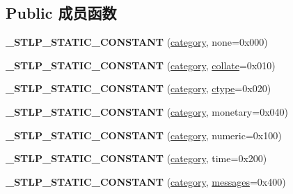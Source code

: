 \subsection*{Public 成员函数}
\begin{DoxyCompactItemize}
\item 
\mbox{\label{classlocale_a877d7476d068fb569aa14200c6323edd}} 
{\bfseries \+\_\+\+S\+T\+L\+P\+\_\+\+S\+T\+A\+T\+I\+C\+\_\+\+C\+O\+N\+S\+T\+A\+NT} (\hyperlink{structcategory}{category}, none=0x000)
\item 
\mbox{\label{classlocale_ab01bb09e7d17151e6d91c473d5b57ec4}} 
{\bfseries \+\_\+\+S\+T\+L\+P\+\_\+\+S\+T\+A\+T\+I\+C\+\_\+\+C\+O\+N\+S\+T\+A\+NT} (\hyperlink{structcategory}{category}, \hyperlink{classcollate}{collate}=0x010)
\item 
\mbox{\label{classlocale_aa0a9eebc63078c7cad673c4ded64fda9}} 
{\bfseries \+\_\+\+S\+T\+L\+P\+\_\+\+S\+T\+A\+T\+I\+C\+\_\+\+C\+O\+N\+S\+T\+A\+NT} (\hyperlink{structcategory}{category}, \hyperlink{classctype}{ctype}=0x020)
\item 
\mbox{\label{classlocale_af94ee798556ada2248d922edc104d879}} 
{\bfseries \+\_\+\+S\+T\+L\+P\+\_\+\+S\+T\+A\+T\+I\+C\+\_\+\+C\+O\+N\+S\+T\+A\+NT} (\hyperlink{structcategory}{category}, monetary=0x040)
\item 
\mbox{\label{classlocale_a2085a60e494f4cfb5bd7d51af5da8d30}} 
{\bfseries \+\_\+\+S\+T\+L\+P\+\_\+\+S\+T\+A\+T\+I\+C\+\_\+\+C\+O\+N\+S\+T\+A\+NT} (\hyperlink{structcategory}{category}, numeric=0x100)
\item 
\mbox{\label{classlocale_a67fc195aea0be6e86085c40d17589c01}} 
{\bfseries \+\_\+\+S\+T\+L\+P\+\_\+\+S\+T\+A\+T\+I\+C\+\_\+\+C\+O\+N\+S\+T\+A\+NT} (\hyperlink{structcategory}{category}, time=0x200)
\item 
\mbox{\label{classlocale_ad6504e4efd9535d648654bb8bc7b13bf}} 
{\bfseries \+\_\+\+S\+T\+L\+P\+\_\+\+S\+T\+A\+T\+I\+C\+\_\+\+C\+O\+N\+S\+T\+A\+NT} (\hyperlink{structcategory}{category}, \hyperlink{classmessages}{messages}=0x400)
\item 
\mbox{\label{classlocale_a5e40f1f370e09485494ea3ecdbdee97d}} 

\end{DoxyCompactItemize}
